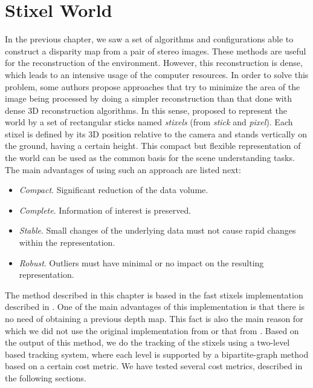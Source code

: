 \graphicspath{{./images/chapter04/bmps/}{./images/chapter04/vects/}{./images/chapter04/}}

\chapter{Stixel World}\label{ch:chapter04}

In the previous chapter, we saw a set of algorithms and configurations able to construct a disparity map from a pair of stereo images. These methods are useful for the reconstruction of the environment. However, this reconstruction is dense, which leads to an intensive usage of the computer resources. In order to solve this problem, some authors propose approaches that try to minimize the area of the image being processed by doing a simpler reconstruction than that done with dense 3D reconstruction algorithms. In this sense, \cite{badino2009stixel} proposed to represent the world by a set of rectangular sticks named \emph{stixels} (from \emph{stick} and \emph{pixel}). Each stixel is defined by its 3D position relative to the camera and stands vertically on the ground, having a certain height.
This compact but flexible representation of the world can be used as the common basis for the scene understanding tasks. The main advantages of using such an approach are listed next:
\begin{itemize}
 \item \emph{Compact}. Significant reduction of the data volume.
 \item \emph{Complete}. Information of interest is preserved.
 \item \emph{Stable}. Small changes of the underlying data must not cause rapid changes within the representation.
 \item \emph{Robust}. Outliers must have minimal or no impact on the resulting representation.
\end{itemize}

The method described in this chapter is based in the fast stixels implementation described in \cite{benenson2012pedestrian}. One of the main advantages of this implementation is that there is no need of obtaining a previous depth map. This fact is also the main reason for which we did not use the original implementation from \cite{badino2009stixel} or that from \cite{pfeiffer2010efficient}. Based on the output of this method, we do the tracking of the stixels using a two-level based tracking system, where each level is supported by a bipartite-graph method based on a certain cost metric. We have tested several cost metrics, described in the following sections.

